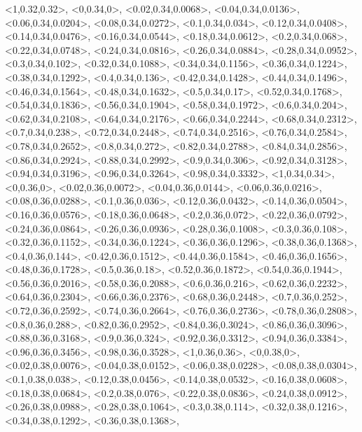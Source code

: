 \documentclass[a4paper,10pt]{article}
\begin{document}
\begin{eulernotebook}
\begin{euleroutput}
  <1,0.32,0.32>,
  <0,0.34,0>,
  <0.02,0.34,0.0068>,
  <0.04,0.34,0.0136>,
  <0.06,0.34,0.0204>,
  <0.08,0.34,0.0272>,
  <0.1,0.34,0.034>,
  <0.12,0.34,0.0408>,
  <0.14,0.34,0.0476>,
  <0.16,0.34,0.0544>,
  <0.18,0.34,0.0612>,
  <0.2,0.34,0.068>,
  <0.22,0.34,0.0748>,
  <0.24,0.34,0.0816>,
  <0.26,0.34,0.0884>,
  <0.28,0.34,0.0952>,
  <0.3,0.34,0.102>,
  <0.32,0.34,0.1088>,
  <0.34,0.34,0.1156>,
  <0.36,0.34,0.1224>,
  <0.38,0.34,0.1292>,
  <0.4,0.34,0.136>,
  <0.42,0.34,0.1428>,
  <0.44,0.34,0.1496>,
  <0.46,0.34,0.1564>,
  <0.48,0.34,0.1632>,
  <0.5,0.34,0.17>,
  <0.52,0.34,0.1768>,
  <0.54,0.34,0.1836>,
  <0.56,0.34,0.1904>,
  <0.58,0.34,0.1972>,
  <0.6,0.34,0.204>,
  <0.62,0.34,0.2108>,
  <0.64,0.34,0.2176>,
  <0.66,0.34,0.2244>,
  <0.68,0.34,0.2312>,
  <0.7,0.34,0.238>,
  <0.72,0.34,0.2448>,
  <0.74,0.34,0.2516>,
  <0.76,0.34,0.2584>,
  <0.78,0.34,0.2652>,
  <0.8,0.34,0.272>,
  <0.82,0.34,0.2788>,
  <0.84,0.34,0.2856>,
  <0.86,0.34,0.2924>,
  <0.88,0.34,0.2992>,
  <0.9,0.34,0.306>,
  <0.92,0.34,0.3128>,
  <0.94,0.34,0.3196>,
  <0.96,0.34,0.3264>,
  <0.98,0.34,0.3332>,
  <1,0.34,0.34>,
  <0,0.36,0>,
  <0.02,0.36,0.0072>,
  <0.04,0.36,0.0144>,
  <0.06,0.36,0.0216>,
  <0.08,0.36,0.0288>,
  <0.1,0.36,0.036>,
  <0.12,0.36,0.0432>,
  <0.14,0.36,0.0504>,
  <0.16,0.36,0.0576>,
  <0.18,0.36,0.0648>,
  <0.2,0.36,0.072>,
  <0.22,0.36,0.0792>,
  <0.24,0.36,0.0864>,
  <0.26,0.36,0.0936>,
  <0.28,0.36,0.1008>,
  <0.3,0.36,0.108>,
  <0.32,0.36,0.1152>,
  <0.34,0.36,0.1224>,
  <0.36,0.36,0.1296>,
  <0.38,0.36,0.1368>,
  <0.4,0.36,0.144>,
  <0.42,0.36,0.1512>,
  <0.44,0.36,0.1584>,
  <0.46,0.36,0.1656>,
  <0.48,0.36,0.1728>,
  <0.5,0.36,0.18>,
  <0.52,0.36,0.1872>,
  <0.54,0.36,0.1944>,
  <0.56,0.36,0.2016>,
  <0.58,0.36,0.2088>,
  <0.6,0.36,0.216>,
  <0.62,0.36,0.2232>,
  <0.64,0.36,0.2304>,
  <0.66,0.36,0.2376>,
  <0.68,0.36,0.2448>,
  <0.7,0.36,0.252>,
  <0.72,0.36,0.2592>,
  <0.74,0.36,0.2664>,
  <0.76,0.36,0.2736>,
  <0.78,0.36,0.2808>,
  <0.8,0.36,0.288>,
  <0.82,0.36,0.2952>,
  <0.84,0.36,0.3024>,
  <0.86,0.36,0.3096>,
  <0.88,0.36,0.3168>,
  <0.9,0.36,0.324>,
  <0.92,0.36,0.3312>,
  <0.94,0.36,0.3384>,
  <0.96,0.36,0.3456>,
  <0.98,0.36,0.3528>,
  <1,0.36,0.36>,
  <0,0.38,0>,
  <0.02,0.38,0.0076>,
  <0.04,0.38,0.0152>,
  <0.06,0.38,0.0228>,
  <0.08,0.38,0.0304>,
  <0.1,0.38,0.038>,
  <0.12,0.38,0.0456>,
  <0.14,0.38,0.0532>,
  <0.16,0.38,0.0608>,
  <0.18,0.38,0.0684>,
  <0.2,0.38,0.076>,
  <0.22,0.38,0.0836>,
  <0.24,0.38,0.0912>,
  <0.26,0.38,0.0988>,
  <0.28,0.38,0.1064>,
  <0.3,0.38,0.114>,
  <0.32,0.38,0.1216>,
  <0.34,0.38,0.1292>,
  <0.36,0.38,0.1368>,

\end{euleroutput}
\end{eulernotebook}
\end{document}
